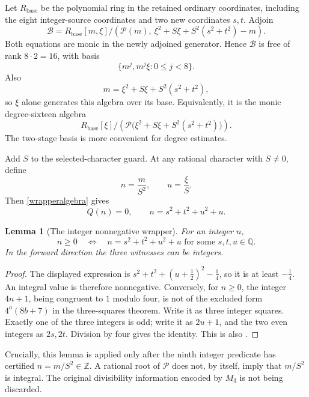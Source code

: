 \documentclass[11pt]{article}
\newtheorem{lemma}[theorem]{Lemma}
\newcommand{\Q}{\mathbb Q}\newcommand{\Z}{\mathbb Z}
\begin{document}
Let \(R_{\mathrm{base}}\) be the polynomial ring in the retained
ordinary coordinates, including the eight integer-source coordinates
and two new coordinates \(s,t\).  Adjoin
\begin{equation}\label{wrapperalgebra}
 \mathcal B=
 R_{\mathrm{base}}[m,\xi]/
 \left(\mathcal P(m),\
       \xi^2+S\xi+S^2(s^2+t^2)-m\right).
\end{equation}
Both equations are monic in the newly adjoined generator.  Hence
\(\mathcal B\) is free of rank \(8\cdot2=16\), with basis
\[
                    \{m^j,m^j\xi:0\le j<8\}.
\]
Also
\[
                     m=\xi^2+S\xi+S^2(s^2+t^2),
\]
so \(\xi\) alone generates this algebra over its base.  Equivalently,
it is the monic degree-sixteen algebra
\[
 R_{\mathrm{base}}[\xi]/
 \left(\mathcal P\bigl(\xi^2+S\xi+S^2(s^2+t^2)\bigr)\right).
\]
The two-stage basis is more convenient for degree estimates.

Add \(S\) to the selected-character guard.  At any rational character
with \(S\ne0\), define
\begin{equation}\label{recovery}
                         n=\frac m{S^2},\qquad u=\frac{\xi}{S}.
\end{equation}
Then \eqref{wrapperalgebra} gives
\begin{equation}\label{recovered}
          Q(n)=0,\qquad n=s^2+t^2+u^2+u.
\end{equation}

\begin{lemma}[The integer nonnegative wrapper]\label{nonnegative}
For an integer \(n\),
\[
 n\ge0
 \quad\Longleftrightarrow\quad
 n=s^2+t^2+u^2+u
 \text{ for some }s,t,u\in\Q.
\]
In the forward direction the three witnesses can be integers.
\end{lemma}
\begin{proof}
The displayed expression is
\(s^2+t^2+(u+\tfrac12)^2-\tfrac14\), so it is at least
\(-\tfrac14\).  An integral value is therefore nonnegative.
Conversely, for \(n\ge0\), the integer \(4n+1\), being congruent to
\(1\) modulo four, is not of the excluded form \(4^a(8b+7)\) in the
three-squares theorem.  Write it as three integer squares.  Exactly
one of the three integers is odd; write it as \(2u+1\), and the two
even integers as \(2s,2t\).  Division by four gives the identity.
This is also \cite[Lemma 6.1]{BDHMS}.
\end{proof}

Crucially, this lemma is applied only after the ninth integer predicate
has certified \(n=m/S^2\in\Z\).  A rational root of \(\mathcal P\)
does not, by itself, imply that \(m/S^2\) is integral.  The original
divisibility information encoded by \(M_3\) is not being discarded.
\end{document}
